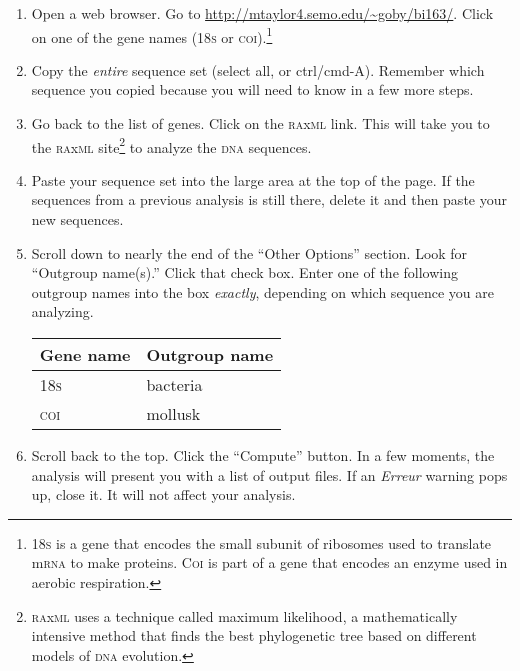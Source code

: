 \documentclass[12pt, hidelinks]{exam}
\newcommand{\dna}{\textsc{dna}}
\begin{document}
\begin{enumerate}

	\item Open a web browser. Go to \url{http://mtaylor4.semo.edu/~goby/bi163/}. Click on one of the gene names (18\textsc{s} or \textsc{coi}).\footnote{18\textsc{s} is a gene that encodes the small subunit of ribosomes used to translate m\textsc{rna} to make proteins. C\textsc{oi} is part of a gene that encodes an enzyme used in aerobic respiration.}%
	
	\item Copy the \emph{entire} sequence set (select all, or ctrl/cmd-A). Remember which sequence you copied because you will need to know in a few more steps.
	
	\item Go back to the list of genes. Click on the \textsc{ra}x\textsc{ml} link. This will take you to the \textsc{ra}x\textsc{ml} site\footnote{\textsc{ra}x\textsc{ml} uses a technique called maximum likelihood, a mathematically intensive method that finds the best phylogenetic tree based on different models of \dna{} evolution.} to analyze the \dna{} sequences. 
	
	\item Paste your sequence set into the large area at the top of the page. If the sequences from a previous analysis is still there, delete it and then paste your new sequences.
	
	\item Scroll down to nearly the end of the ``Other Options'' section. Look for ``Outgroup name(s).'' Click that check box. Enter  one of the following outgroup names into the box \emph{exactly}, depending on which sequence you are analyzing. 
	
		{\centering\begin{tabular}{@{}ll@{}}
		\toprule
		Gene name &	Outgroup name\\
		\midrule
		18\textsc{s}	&  bacteria\\
		\textsc{coi}	& mollusk\\
		\bottomrule		
		\end{tabular}\par
		}
	
	\item Scroll back to the top. Click the ``Compute'' button. In a few moments, the analysis will present you with a list of output files. If an \emph{Erreur} warning pops up, close it. It will not affect your analysis.
	

\end{enumerate}
\end{document}
